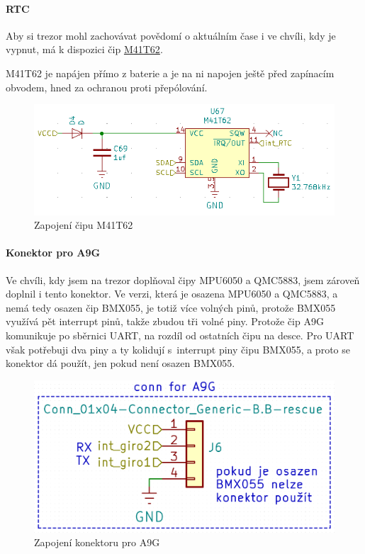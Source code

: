 \newpage

\paragraph{RTC}
Aby si trezor mohl zachovávat povědomí o aktuálním čase i ve chvíli, kdy je vypnut, má k dispozici čip \href{https://datasheet.lcsc.com/szlcsc/STMicroelectronics-M41T62Q6F_C113207.pdf}{M41T62}.

M41T62 je napájen přímo z baterie a je na ni napojen ještě před zapínacím obvodem, hned za ochranou proti přepólování.

\begin{figure}[htbp]
    \centering
    \includegraphics[width=\textwidth]{kapitoly/obrazky/E4/vnimani/RTC.png}
    \caption{Zapojení čipu M41T62}
    \label{fig:E4-M41T62}
\end{figure}

\newpage

\paragraph{Konektor pro A9G} %
Ve chvíli, kdy jsem na trezor doplňoval čipy MPU6050 a QMC5883, jsem zároveň doplnil i tento konektor. Ve verzi, která je osazena MPU6050 a QMC5883, a nemá tedy osazen čip BMX055, je totiž více
volných pinů, protože BMX055 využívá pět interrupt pinů, takže zbudou tři volné piny. Protože čip A9G komunikuje po sběrnici UART, na rozdíl od ostatních čipu na desce. Pro UART však potřebuji
dva piny a ty kolidují s~interrupt piny čipu BMX055, a proto se konektor dá použít, jen pokud není osazen BMX055.

\begin{figure}[htbp]
    \centering
    \includegraphics[width=\textwidth]{kapitoly/obrazky/E4/vnimani/conn-A9G.png}
    \caption{Zapojení konektoru pro A9G}
    \label{fig:E4-A9G}
\end{figure}

\newpage